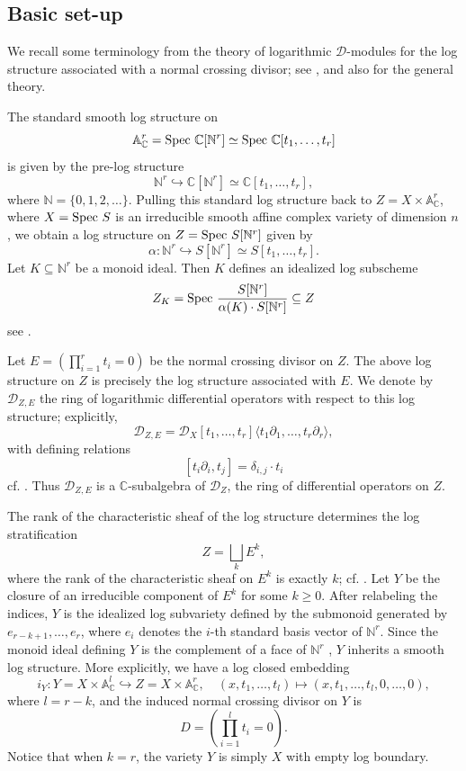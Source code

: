 \documentclass{amsart}
\theoremstyle{plain}
\numberwithin{theorem}{section}
\theoremstyle{definition}
\theoremstyle{remark}
\theoremstyle{definition}
\newcommand{\A}{\mathbb{A}}
\newcommand{\C}{\mathbb{C}} %
\newcommand{\N}{\mathbb{N}}
\newcommand{\shD}{\mathscr{D}}
\newcommand{\Spec}{\textup{Spec }}
\begin{document}
\subsection{Basic set-up}\label{subsect:logDmodule}
We recall some terminology from the theory of logarithmic $\shD$-modules for the log structure associated with a normal crossing divisor; see \cite{WZ}, and also \cite{WuHohl} for the general theory.

The standard smooth log structure on
\[
\A_\C^r=\Spec \C[\N^r]\simeq \Spec \C[t_1,\dots,t_r]
\]
is given by the pre-log structure
\[
\N^r\hookrightarrow \C[\N^r]\simeq \C[t_1,\dots,t_r],
\]
where $\N=\{0,1,2,\dots\}$. Pulling this standard log structure back to
$Z=X\times \A_\C^r$, where $X=\Spec S$ is an irreducible smooth affine complex variety of dimension $n$, we obtain a log structure on
$Z=\Spec S[\N^r]$ given by
\[
\alpha\colon \N^r\hookrightarrow S[\N^r]\simeq S[t_1,\dots,t_r].
\]
Let $K\subseteq \N^r$ be a monoid ideal. Then $K$ defines an idealized log subscheme
\[
Z_K=\Spec \frac{S[\N^r]}{\alpha(K)\cdot S[\N^r]}\subseteq Z
\]
see \cite[III.1.3]{Ogusbook}.

Let $E=(\prod_{i=1}^r t_i=0)$ be the normal crossing divisor on $Z$. The above log structure on $Z$ is precisely the log structure associated with $E$. We denote by $\shD_{Z,E}$ the ring of logarithmic differential operators with respect to this log structure; explicitly,
\[
\shD_{Z,E}
=
\shD_X[t_1,\dots,t_r]\langle t_1\partial_{1},\dots,t_r\partial_r\rangle,
\]
with defining relations
\[
[t_i\partial_i,t_j]=\delta_{i,j}\cdot t_i
\]
cf. \cite[\S2]{WZ}. Thus $\shD_{Z,E}$ is a $\C$-subalgebra of $\shD_Z$, the ring of differential operators on $Z$.

The rank of the characteristic sheaf of the log structure determines the log stratification
\[
Z=\bigsqcup_k E^k,
\]
where the rank of the characteristic sheaf on $E^k$ is exactly $k$; cf. \cite{Ogusbook}. Let $Y$ be the closure of an irreducible component of $E^k$ for some $k\geq 0$. After relabeling the indices, $Y$ is the idealized log subvariety defined by the submonoid generated by $e_{r-k+1},\dots,e_r$, where $e_i$ denotes the $i$-th standard basis vector of $\N^r$. Since the monoid ideal defining $Y$ is the complement of a face of $\N^r$ \cite[Def.1.4.1]{Ogusbook}, $Y$ inherits a smooth log structure. More explicitly, we have a log closed embedding
\[
i_Y\colon Y=X\times \A_\C^l\hookrightarrow Z=X\times \A_\C^r,
\quad
(x,t_1,\dots,t_l)\mapsto (x,t_1,\dots,t_l,0,\dots,0),
\]
where $l=r-k$, and the induced normal crossing divisor on $Y$ is
\[
D=\left(\prod_{i=1}^l t_i=0\right).
\]
Notice that when $k=r$, the variety $Y$ is simply $X$ with empty log boundary.
\end{document}
